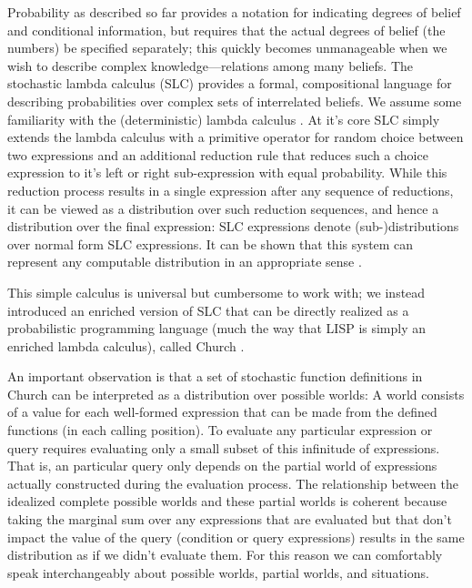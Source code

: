 \documentclass[12pt]{article}
\newcounter{definition}
\begin{document}
Probability as described so far provides a notation for indicating degrees of belief and conditional information, but requires that the actual degrees of belief (the numbers) be specified separately; this quickly becomes unmanageable when we wish to describe complex knowledge---relations among many beliefs. The stochastic lambda calculus (SLC) provides a formal, compositional language for describing probabilities over complex sets of interrelated beliefs. We assume some familiarity with the (deterministic) lambda calculus \cite{lambda}. At it's core SLC simply extends the lambda calculus with a primitive operator for random choice between two expressions and an additional reduction rule that reduces such a choice expression to it's left or right sub-expression with equal probability. While this reduction process results in a single expression after any sequence of reductions, it can be viewed as a distribution over such reduction sequences, and hence a distribution over the final expression: SLC expressions denote (sub-)distributions over normal form SLC expressions. It can be shown that this system can represent any computable distribution in an appropriate sense \cite[see for example][]{PfefferRamsey,FreeRoy}.

This simple calculus is universal but cumbersome to work with; we instead introduced an enriched version of SLC that can be directly realized as a probabilistic programming language (much the way that LISP is simply an enriched lambda calculus), called Church \cite{Goodman}.


An important observation is that a set of stochastic function definitions in Church can be interpreted as a distribution over possible worlds: A world consists of a value for each well-formed expression that can be made from the defined functions (in each calling position). To evaluate any particular expression or query requires evaluating only a small subset of this infinitude of expressions. That is, an particular query only depends on the partial world of expressions actually constructed during the evaluation process. The relationship between the idealized complete possible worlds and these partial worlds is coherent because taking the marginal sum over any expressions that are evaluated but that don't impact the value of the query (condition or query expressions) results in the same distribution as if we didn't evaluate them.  For this reason we can comfortably speak interchangeably about possible worlds, partial worlds, and situations.
\end{document}
